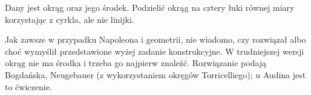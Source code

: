%

\begin{problem}
\label{napoleon_problem}
	Dany jest okrąg oraz jego środek.
	Podzielić okrąg na cztery łuki równej miary korzystając z cyrkla, ale nie linijki.
\end{problem}

Jak zawsze w przypadku Napoleona i geometrii, nie wiadomo, czy rozwiązał albo choć wymyślił przedstawione wyżej zadanie konstrukcyjne.
%
W trudniejszej wersji okrąg nie ma środka i trzeba go najpierw znaleźć.
Rozwiązanie podają Bogdańska, Neugebauer \cite[s. 116]{neugebauer_2018} (z wykorzystaniem okręgów Torricelliego); 
u Audina \cite[s. 105]{audin_2003} jest to ćwiczenie. 
%

%